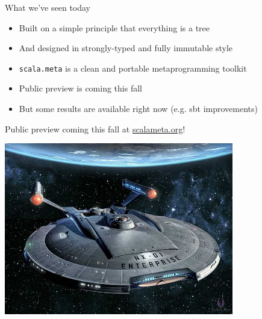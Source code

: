\documentclass[svgnames,dvipsnames,hyperref={bookmarks=false},usepdftitle=false]{beamer}
\begin{document}
\begin{frame}{What we've seen today}
\begin{itemize}
\item Built on a simple principle that everything is a tree
\item And designed in strongly-typed and fully immutable style
\item \texttt{scala.meta} is a clean and portable metaprogramming toolkit
\item Public preview is coming this fall
\item But some results are available right now (e.g. sbt improvements)
\end{itemize}
\end{frame}

\begin{frame}[c, fragile]{Public preview coming this fall at \href{http://scalameta.org/}{scalameta.org}!}
\begin{center}
\includegraphics[height=7.5cm]{nx01-therealthing.jpg}\\
\end{center}
\end{frame}
\end{document}
